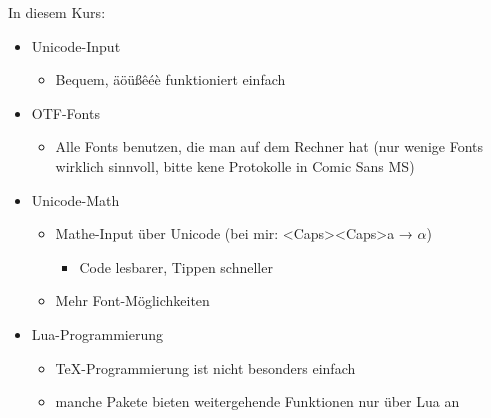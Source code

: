\begin{frame}[fragile]{In diesem Kurs: \LuaTeX}
  \begin{itemize}
    \item Unicode-Input
      \begin{itemize}
        \item Bequem, äöüßêéè funktioniert einfach
      \end{itemize}
    \item OTF-Fonts
      \begin{itemize}
        \item Alle Fonts benutzen, die man auf dem Rechner hat (nur wenige Fonts wirklich sinnvoll, bitte kene Protokolle in Comic Sans MS)
      \end{itemize}
    \item Unicode-Math
      \begin{itemize}
        \item Mathe-Input über Unicode (bei mir: <Caps><Caps>a → $α$)
          \begin{itemize}
            \item Code lesbarer, Tippen schneller
            \end{itemize}
        \item Mehr Font-Möglichkeiten
      \end{itemize}
    \item Lua-Programmierung
      \begin{itemize}
        \item \TeX-Programmierung ist nicht besonders einfach
        \item manche Pakete bieten weitergehende Funktionen nur über Lua an
      \end{itemize}
  \end{itemize}
\end{frame}
